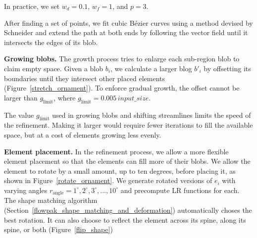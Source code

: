 In practice, we set $w_d = 0.1$, $w_f=1$, and $p = 3$.

After finding a set of points, we fit cubic B\'ezier curves using a method
devised by Schneider \cite{Schneider1990} and extend the path at both ends 
by following
the vector field until it intersects the edges of its blob. 

\textbf{Growing blobs.} The growth process tries to enlarge each sub-region blob to
claim empty space.
Given a blob $b_{i}$, we calculate a larger blog $b'_{i}$ 
by offsetting its boundaries until they intersect other placed elements (Figure~\ref{stretch_ornament}).
To enforce gradual growth, the offset cannot be larger than $g_\mathrm{limit}$, where
$g_\mathrm{limit}=0.005\,input\_size$.

The value $g_\mathrm{limit}$ used in growing blobs and shifting streamlines limits the speed of
the refinement.  Making it larger would require fewer iterations to fill the available space,
but at a cost of elements growing less evenly. 

\textbf{Element placement.}
In the refinement process, we allow a more flexible element placement so that
the elements can fill more of their blobs.  We allow the element
to rotate by a small amount, up to ten degrees, before placing it, as shown in
Figure~\ref{rotate_ornament}. 
We generate rotated versions of $e_{i}$ 
with varying angles $r_\mathrm{angle} = {1^{\circ}, 2^{\circ}, 3^{\circ}, ..., 10^{\circ}}$
and precompute LR functions for each. The shape matching algorithm
(Section~\ref{flowpak_shape_matching_and_deformation}) automatically choses the best rotation. It
can also choose to reflect the element across its spine, along its spine, or both (Figure~\ref{flip_shape})

